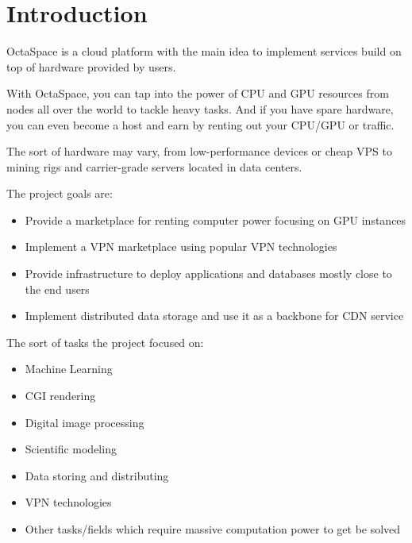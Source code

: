 \section{Introduction}

OctaSpace is a cloud platform with the main idea to implement services build on top of hardware provided by users.

With OctaSpace, you can tap into the power of CPU and GPU resources from nodes all over the world to tackle heavy tasks.
And if you have spare hardware, you can even become a host and earn by renting out your CPU/GPU or traffic.

The sort of hardware may vary, from low-performance devices or cheap VPS to mining rigs and carrier-grade servers located in data centers.

The project goals are:

\begin{itemize}
    \item Provide a marketplace for renting computer power focusing on GPU instances
    \item Implement a VPN marketplace using popular VPN technologies
    \item Provide infrastructure to deploy applications and databases mostly close to the end users
    \item Implement distributed data storage and use it as a backbone for CDN service
\end{itemize}

The sort of tasks the project focused on:

\begin{itemize}
    \item Machine Learning
    \item CGI rendering
    \item Digital image processing
    \item Scientific modeling
    \item Data storing and distributing
    \item VPN technologies
    \item Other tasks/fields which require massive computation power to get be solved
\end{itemize}
